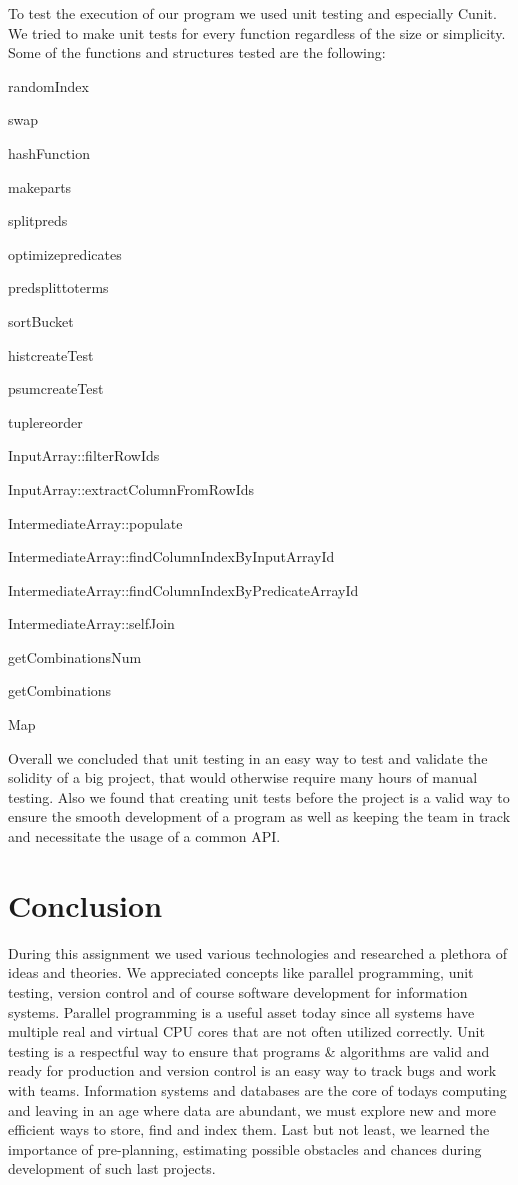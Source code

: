 \documentclass{ws-ijprai}
\begin{document}
\tab To test the execution of our program we used unit testing and especially Cunit. We tried to make unit tests for every function regardless of the size or simplicity. Some of the functions and structures tested are the following: 
\begin{itemlist}
\item randomIndex
\item swap
\item hashFunction
\item makeparts
\item splitpreds
\item optimizepredicates
\item predsplittoterms
\item sortBucket
\item histcreateTest
\item psumcreateTest
\item tuplereorder
\item InputArray::filterRowIds
\item InputArray::extractColumnFromRowIds
\item IntermediateArray::populate
\item IntermediateArray::findColumnIndexByInputArrayId
\item IntermediateArray::findColumnIndexByPredicateArrayId
\item IntermediateArray::selfJoin
\item getCombinationsNum
\item getCombinations
\item Map
\end{itemlist}
\tab Overall we concluded that unit testing in an easy way to test and validate the solidity of a big project, that would otherwise require many hours of manual testing. Also we found that creating unit tests before the project is a valid way to ensure the smooth development of a program as well as keeping the team in track and necessitate the usage of a common API.
\clearpage
\section{Conclusion}

\tab During this assignment we used various technologies and researched a plethora of ideas and theories. We appreciated concepts like parallel programming, unit testing, version control and of course software development for information systems. Parallel programming is a useful asset today since all systems have multiple real and virtual CPU cores that are not often utilized correctly. Unit testing is a respectful way to ensure that programs \& algorithms are valid and ready for production and version control is an easy way to track bugs and work with teams. Information systems and databases are the core of today\textquotesingle s computing and leaving in an age where data are abundant, we must explore new and more efficient ways to store, find and index them. Last but not least, we learned the importance of pre-planning, estimating possible obstacles and chances during development of such last projects.
\clearpage
\end{document}
